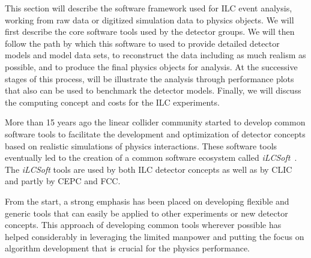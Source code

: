 %
%
\newcommand{\fix}[1]{\textcolor{red}{\texttt{#1}}} %

\newcommand{\CPP}{C\nolinebreak\hspace{-.05em}\raisebox{.4ex}{\tiny\bf
    +}\nolinebreak\hspace{-.10em}\raisebox{.4ex}{\tiny\bf +}}



This section will describe the software framework used for ILC event
analysis, working from raw data or digitized simulation data to
physics objects.   We will first describe the core software tools used
by the detector groups.  We will then follow the path by which this
software to used to provide detailed detector models and model data
sets,   to reconstruct the data including as much realism as possible,
and to produce the final physics objects for analysis.    At the
successive stages of this process, will be illustrate the analysis
through performance plots that also can be used to benchmark the
detector models.  Finally, we will discuss the computing concept and
costs for the ILC experiments. 


More than 15 years ago the linear collider community started to develop common software
tools to facilitate the development and optimization of detector concepts based on realistic
simulations of physics interactions. These software tools eventually led to the creation of
a common software ecosystem called \emph{iLCSoft}~\cite{bib:ilcsoft}.
The \emph{iLCSoft} tools are used by both ILC detector concepts as well as by CLIC
and partly by CEPC and FCC.

From the start, a strong emphasis has been placed on developing flexible and generic tools
that can easily be applied to other experiments or new detector concepts. 
This approach of developing common tools wherever possible has helped considerably in
leveraging the limited manpower and putting the focus on algorithm development that
is crucial for the physics performance. 



